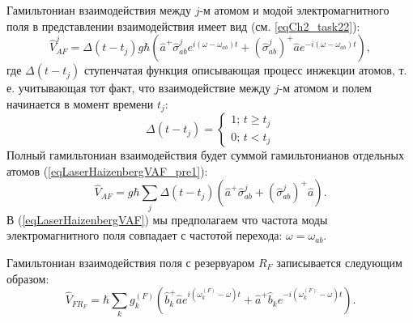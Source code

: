 Гамильтониан взаимодействия между $j$-м атомом и модой
электромагнитного поля в представлении
взаимодействия имеет вид (см. \ref{eqCh2_task22}):
\begin{equation}
\hat{V}_{AF}^j =
\Delta\left(t - t_j\right) 
g \hbar \left(
\hat{a}^{+}\hat{\sigma}^{j}_{ab} e^{i \left(\omega -
  \omega_{ab}\right)t} +
\left(\hat{\sigma}^{j}_{ab}\right)^{+} 
\hat{a} e^{-i \left(\omega - \omega_{ab}\right)t}
\right),
\label{eqLaserHaizenbergVAF_pre1}
\end{equation}
где $\Delta\left(t - t_j\right)$ ступенчатая функция описывающая
процесс инжекции атомов, т. е. учитывающая тот факт, что
взаимодействие между $j$-м атомом и полем начинается в момент времени $t_j$:
\begin{equation}
\Delta\left(t - t_j\right) =
\left\{
\begin{array}{c}
1;\, t \ge t_j \\
0;\, t < t_j 
\end{array}
\right.
\nonumber
\end{equation}
Полный гамильтониан взаимодействия будет суммой гамильтонианов
отдельных атомов
(\ref{eqLaserHaizenbergVAF_pre1}):
\begin{equation}
\hat{V}_{AF} =
g \hbar
\sum_j
\Delta\left(t - t_j\right) 
 \left(
\hat{a}^{+}\hat{\sigma}^{j}_{ab}  +
\left(\hat{\sigma}^{j}_{ab}\right)^{+} 
\hat{a}
\right).
\label{eqLaserHaizenbergVAF}
\end{equation}
В (\ref{eqLaserHaizenbergVAF}) мы предполагаем что частота моды
электромагнитного поля совпадает с частотой перехода: $\omega =
\omega_{ab}$.

Гамильтониан взаимодействия поля с резервуаром $R_F$ записывается
следующим образом: 
\begin{equation}
\hat{V}_{FR_F} =
\hbar
\sum_k
g_k^{(F)}
 \left(
\hat{b}_k^{+}\hat{a} e^{i\left(\omega_k^{(F)} - \omega\right)t} +
\hat{a}^{+}\hat{b}_k e^{-i\left(\omega_k^{(F)} - \omega\right)t}
\right).
\label{eqLaserHaizenbergVFRF}
\end{equation}


